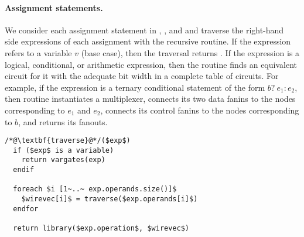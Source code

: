 \paragraph{Assignment statements.}
We consider each assignment statement in , ,
and  and traverse the right-hand side expressions of
each assignment with the recursive  routine. 
%
If the expression refers to a variable $v$ (base case), 
then the traversal returns . 
%
If the expression is a logical, conditional, or arithmetic expression, then
the  routine finds an equivalent circuit for it with the adequate bit
width in a complete table of circuits.
For example, if the expression is a ternary conditional statement of the
form $b?~e_1:e_2$, then routine  instantiates a multiplexer, 
connects its two data fanins to the nodes corresponding to $e_1$ and $e_2$, connects its control fanins to the nodes corresponding to $b$,
and returns its fanouts. 
%
\begin{lstlisting}
/*@\textbf{traverse}@*/($exp$)
  if ($exp$ is a variable) 
    return vargates(exp)
  endif

  foreach $i [1~..~ exp.operands.size()]$ 
    $wirevec[i]$ = traverse($exp.operands[i]$) 
  endfor

  return library($exp.operation$, $wirevec$)
\end{lstlisting}
%
%
%


